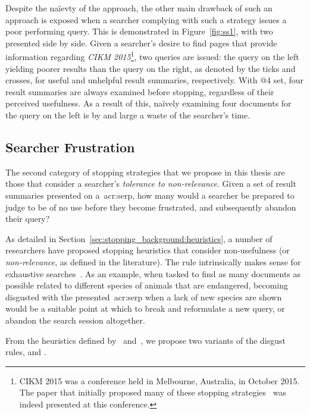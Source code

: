Despite the na\"{i}evty of the approach, the other main drawback of such an approach is exposed when a searcher complying with such a strategy issues a poor performing query. This is demonstrated in Figure~\ref{fig:ss1}, with two~ presented side by side. Given a searcher's desire to find pages that provide information regarding \emph{CIKM 2015}\footnote{CIKM 2015 was a conference held in Melbourne, Australia, in October 2015. The paper that initially proposed many of these stopping strategies~\cite{maxwell2015stopping_strategies} was indeed presented at this conference.}, two queries are issued: the query on the left yielding poorer results than the query on the right, as denoted by the ticks and crosses, for useful and unhelpful result summaries, respectively. With  @4 set, four result summaries are always examined before stopping, regardless of their perceived usefulness. As a result of this, na\"{i}vely examining four documents for the query on the left is by and large a waste of the searcher's time.

\subsection{Searcher Frustration}
The second category of stopping strategies that we propose in this thesis are those that consider a searcher's \emph{tolerance to non-relevance}. Given a set of result summaries presented on a~\gls{acr:serp}, how many would a searcher be prepared to judge to be of no use before they become frustrated, and subsequently abandon their query?

As detailed in Section~\ref{sec:stopping_background:heuristics}, a number of researchers have proposed stopping heuristics that consider non-usefulness (or \emph{non-relevance}, as defined in the literature). The rule intrinsically makes sense for exhaustive searches~\cite{kraft1979stopping_rules}. As an example, when tasked to find as many documents as possible related to different species of animals that are endangered, becoming disgusted with the presented~\gls{acr:serp} when a lack of new species are shown would be a suitable point at which to break and reformulate a new query, or abandon the search session altogether.

From the heuristics defined by~\citealt{cooper1973retrieval_effectiveness_ii} and~\citealt{kraft1979stopping_rules}, we propose two variants of the disgust rules,  and .

